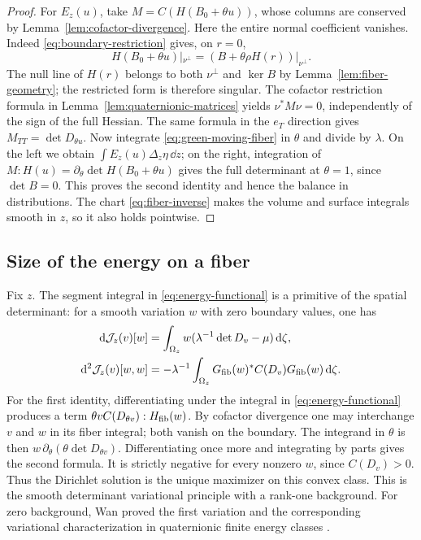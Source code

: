 \begin{proof}
For $E_z(u)$, take $M=C(H(B_0+\theta u))$, whose columns are conserved
by Lemma~\ref{lem:cofactor-divergence}. Here the entire normal
coefficient vanishes. Indeed \eqref{eq:boundary-restriction} gives,
on $r=0$,
\[
 H(B_0+\theta u)|_{\nu^\perp}
       =(B+\theta\rho H(r))|_{\nu^\perp}.
\]
The null line of $H(r)$ belongs to both $\nu^\perp$ and $\ker B$ by
Lemma~\ref{lem:fiber-geometry}; the restricted form is therefore
singular. The cofactor restriction formula in
Lemma~\ref{lem:quaternionic-matrices} yields $\nu^*M\nu=0$, independently
of the sign of the full Hessian. The same formula in the $e_T$ direction
gives $M_{TT}=\det D_{\theta u}$. Now integrate
\eqref{eq:green-moving-fiber} in $\theta$ and divide by $\lambda$.
On the left we obtain $\int E_z(u)\Delta_z\eta\,\dd z$; on the right,
integration of $M:H(u)=\partial_\theta\det H(B_0+\theta u)$ gives the
full determinant at $\theta=1$, since $\det B=0$. This proves the
second identity and hence the balance in distributions. The chart
\eqref{eq:fiber-inverse} makes the volume and surface integrals smooth
in $z$, so it also holds pointwise.
\end{proof}

\subsection{Size of the energy on a fiber}

Fix $z$. The segment integral in \eqref{eq:energy-functional} is a
primitive of the spatial determinant: for a smooth variation $w$ with
zero boundary values, one has
\begin{align*}
 \mathrm d\mathcal J_z(v)[w]
   &=\int_{\Omega_z}w(\lambda^{-1}\det D_v-\mu)\,\mathrm d\zeta,\\
 \mathrm d^2\mathcal J_z(v)[w,w]
   &=-\lambda^{-1}\int_{\Omega_z}
       G_{\rm fib}(w)^*C(D_v)G_{\rm fib}(w)\,\mathrm d\zeta .
\end{align*}
For the first identity, differentiating under the integral in
\eqref{eq:energy-functional} produces a term
$\theta v C(D_{\theta v}):H_{\rm fib}(w)$. By cofactor divergence one
may interchange $v$ and $w$ in its fiber integral; both vanish on the
boundary. The integrand in $\theta$ is then
$w\,\partial_\theta(\theta\det D_{\theta v})$. Differentiating once
more and integrating by parts gives the second formula. It is strictly
negative for every nonzero $w$, since $C(D_v)>0$. Thus the Dirichlet
solution is the unique maximizer on this convex class. This is the
smooth determinant variational principle with a rank-one background.
For zero background, Wan proved the first variation and the corresponding
variational characterization in quaternionic finite energy classes
\cite[Section~4]{Wan2020}.


